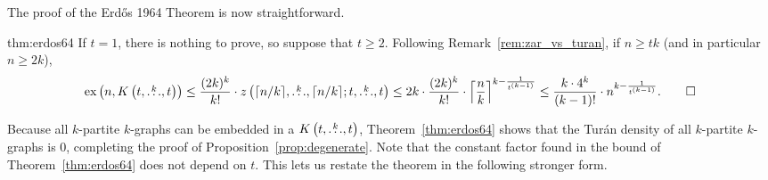 The proof of the Erdős 1964 Theorem is now straightforward.

\begin{delayedproof}{thm:erdos64}
    If $t=1$, there is nothing to prove,
    so suppose that $t \geq 2$.
    Following Remark~\ref{rem:zar_vs_turan}, if $n \geq tk$
    (and in particular $n \geq 2k$),
    \[
        \text{ex} \left( n, K\left(t, \overset{k}{\dots}, t\right) \right)
        \leq \frac{(2k)^k}{k!} \cdot z\left(\lceil n / k \rceil, \overset{k}{\dots}, \lceil n / k \rceil; t, \overset{k}{\dots}, t\right)
        \leq 2k \cdot \frac{(2k)^k}{k!} \cdot \left\lceil \frac{n}{k} \right\rceil^{k - \frac{1}{t^{(k-1)}}}
        \leq \frac{k \cdot 4^k}{(k-1)!} \cdot n^{k - \frac{1}{t^{(k-1)}}}. \qedhere
    \]

\end{delayedproof}

Because all $k$-partite $k$-graphs can be embedded in a $K\left(t, \overset{k}{\dots}, t\right)$,
Theorem~\ref{thm:erdos64} shows that the Turán density of all $k$-partite $k$-graphs is $0$,
completing the proof of Proposition~\ref{prop:degenerate}.
Note that the constant factor found in the bound of Theorem~\ref{thm:erdos64}
does not depend on $t$.
This lets us restate the theorem in the following stronger form.

